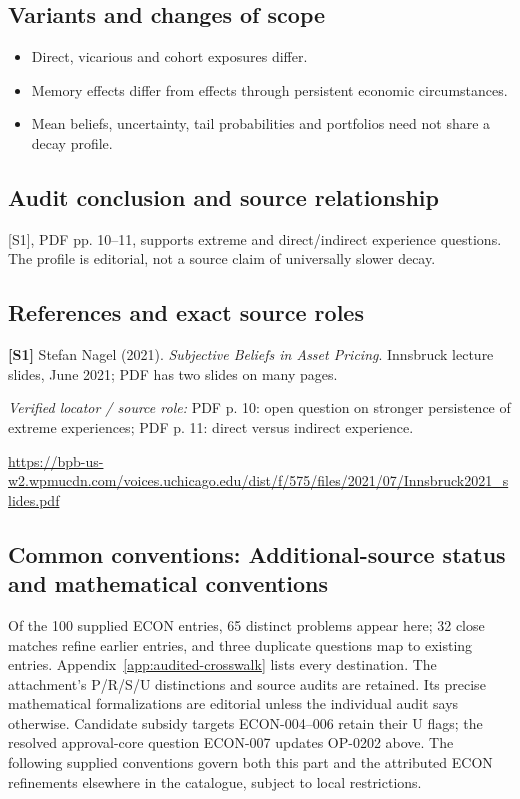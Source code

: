 \documentclass[11pt,a4paper]{article}
\begin{document}
\subsection*{Variants and changes of scope}

\begin{itemize}
\item Direct, vicarious and cohort exposures differ.
\item Memory effects differ from effects through persistent economic circumstances.
\item Mean beliefs, uncertainty, tail probabilities and portfolios need not share a decay profile.
\end{itemize}

\subsection*{Audit conclusion and source relationship}

[S1], PDF pp. 10--11, supports extreme and direct/indirect experience questions. The profile is editorial, not a source claim of universally slower decay.

\subsection*{References and exact source roles}

{\footnotesize\raggedright
\par\noindent\textbf{[S1]} Stefan Nagel (2021). \emph{Subjective Beliefs in Asset Pricing}. Innsbruck lecture slides, June 2021; PDF has two slides on many pages.\par \textit{Verified locator / source role:} PDF p. 10: open question on stronger persistence of extreme experiences; PDF p. 11: direct versus indirect experience.\par \url{https://bpb-us-w2.wpmucdn.com/voices.uchicago.edu/dist/f/575/files/2021/07/Innsbruck2021_slides.pdf}\par\smallskip
}

\subsection*{Common conventions: Additional-source status and mathematical conventions}

\label{audited:conventions}

Of the 100 supplied ECON entries, 65 distinct problems appear here; 32 close
matches refine earlier entries, and three duplicate questions map to existing
entries. Appendix~\ref{app:audited-crosswalk} lists every destination.
The attachment's P/R/S/U distinctions and source audits are retained. Its
precise mathematical formalizations are editorial unless the individual audit
says otherwise. Candidate subsidy targets ECON-004--006 retain their U flags;
the resolved approval-core question ECON-007 updates OP-0202 above.
The following supplied conventions govern both this part and the attributed
ECON refinements elsewhere in the catalogue, subject to local restrictions.
\end{document}
